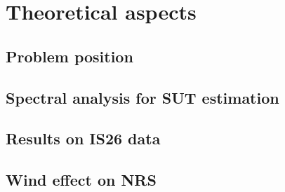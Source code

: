 \documentclass[a4paper, 12pt]{report}
\begin{document}
 \sloppy
 
\tableofcontents
\part{Theoretical aspects}
\chapter{Problem position}


\chapter{Spectral analysis for SUT estimation}
\label{chap:spectralanalysis}


%

\chapter{Results on IS26 data}
\label{chap:IS26results}



\chapter{Wind effect on NRS}
\label{chap:windonNRS}

\end{document}

